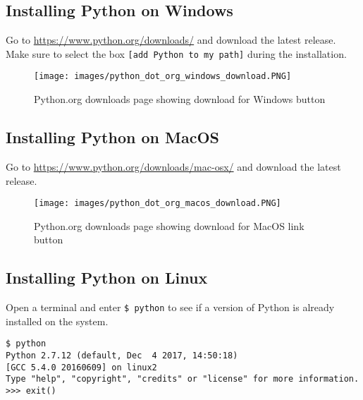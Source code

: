 \documentclass{book}
\makeatletter
\def\maxwidth{\ifdim\Gin@nat@width>\linewidth\linewidth
\else\Gin@nat@width\fi}
\let\Oldincludegraphics\includegraphics
\renewcommand{\includegraphics}[1]{\Oldincludegraphics[width=.8\maxwidth]{#1}}
\newcommand{\passthrough}[1]{#1}
\makeatother
\begin{document}
    
        \hypertarget{installing-python-on-windows}{%
\subsection{Installing Python on
Windows}\label{installing-python-on-windows}}

Go to \url{https://www.python.org/downloads/} and download the latest
release. Make sure to select the box
\passthrough{\lstinline![add Python to my path]!} during the
installation.

\begin{figure}
\centering
\texttt{[image: images/python\_dot\_org\_windows\_download.PNG]}
\caption{Python.org downloads page showing download for Windows button}
\end{figure}
    




    
        \hypertarget{installing-python-on-macos}{%
\subsection{Installing Python on
MacOS}\label{installing-python-on-macos}}

Go to \url{https://www.python.org/downloads/mac-osx/} and download the
latest release.

\begin{figure}
\centering
\texttt{[image: images/python\_dot\_org\_macos\_download.PNG]}
\caption{Python.org downloads page showing download for MacOS link
button}
\end{figure}
    




    
        \hypertarget{installing-python-on-linux}{%
\subsection{Installing Python on
Linux}\label{installing-python-on-linux}}

Open a terminal and enter \passthrough{\lstinline!$ python!} to see if a
version of Python is already installed on the system.

\begin{lstlisting}
$ python
Python 2.7.12 (default, Dec  4 2017, 14:50:18)
[GCC 5.4.0 20160609] on linux2
Type "help", "copyright", "credits" or "license" for more information.
>>> exit()
\end{lstlisting}
\end{document}
